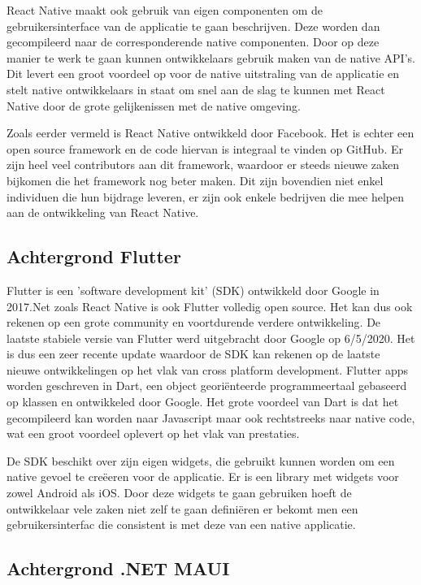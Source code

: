 React Native maakt ook gebruik van eigen componenten om de gebruikersinterface van de applicatie te gaan beschrijven. Deze worden dan gecompileerd naar de corresponderende native componenten. Door op deze manier te werk te gaan kunnen ontwikkelaars gebruik maken van de native API's. Dit levert een groot voordeel op voor de native uitstraling van de applicatie en stelt native ontwikkelaars in staat om snel aan de slag te kunnen met React Native door de grote gelijkenissen met de native omgeving.

Zoals eerder vermeld is React Native ontwikkeld door Facebook. Het is echter een open source framework en de code hiervan is integraal te vinden op GitHub. Er zijn heel veel contributors aan dit framework, waardoor er steeds nieuwe zaken bijkomen die het framework nog beter maken. Dit zijn bovendien niet enkel individuen die hun bijdrage leveren, er zijn ook enkele bedrijven die mee helpen aan de ontwikkeling van React Native.

\subsection{Achtergrond Flutter}

Flutter is een 'software development kit' (SDK) ontwikkeld door Google in 2017.Net zoals React Native is ook Flutter volledig open source. Het kan dus ook rekenen op een grote community en voortdurende verdere ontwikkeling. De laatste stabiele versie van Flutter werd uitgebracht door Google op 6/5/2020. Het is dus een zeer recente update waardoor de SDK kan rekenen op de laatste nieuwe ontwikkelingen op het vlak van cross platform development. Flutter apps worden geschreven in Dart, een object georiënteerde programmeertaal gebaseerd op klassen en ontwikkeled door Google. Het grote voordeel van Dart is dat het gecompileerd kan worden naar Javascript maar ook rechtstreeks naar native code, wat een groot voordeel oplevert op het vlak van prestaties. 

De SDK beschikt over zijn eigen widgets, die gebruikt kunnen worden om een native gevoel te creëeren voor de applicatie. Er is een library met widgets voor zowel Android als iOS. Door deze widgets te gaan gebruiken hoeft de ontwikkelaar vele zaken niet zelf te gaan definiëren er bekomt men een gebruikersinterfac die consistent is met deze van een native applicatie. 

\subsection{Achtergrond .NET MAUI}

